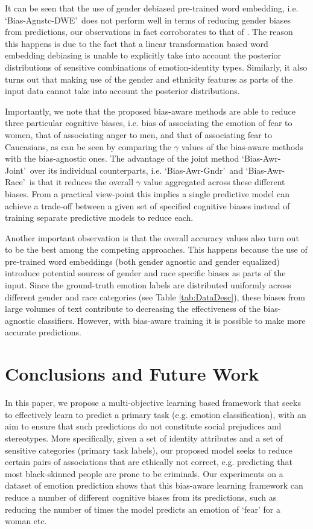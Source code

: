 \documentclass[letterpaper]{article}
\newcommand{\STWRDW}{`Bias-Agnstc-DWE'~}
\newcommand{\MTLG}{`Bias-Awr-Gndr'~}
\newcommand{\MTLR}{`Bias-Awr-Race'~}
\newcommand{\MTLB}{`Bias-Awr-Joint'~}
\begin{document}
It can be seen that the use of gender debiased pre-trained word embedding, i.e. \STWRDW does not perform well in terms of reducing gender biases from predictions, our observations in fact corroborates to that of \citep{gonen-goldberg-2019}. The reason this happens is due to the fact that a linear transformation based word embedding debiasing is unable to explicitly take into account the posterior distributions of sensitive combinations of emotion-identity types. Similarly, it also turns out that making use of the gender and ethnicity features as parts of the input data cannot take into account the posterior distributions.

Importantly, we note that the proposed bias-aware methods are
able to reduce three particular cognitive biases, i.e. bias of associating the emotion of fear to women, that of associating anger to men, and that of associating fear to Caucasians, as can be seen by comparing the $\gamma$ values of the bias-aware methods with the bias-agnostic ones. The advantage of the joint method \MTLB over its individual counterparts, i.e. \MTLG and \MTLR is that it reduces the overall $\gamma$ value aggregated across these different biases. From a practical view-point this implies a single predictive model can achieve a trade-off between a given set of specified cognitive biases instead of training separate predictive models to reduce each.

Another important observation is that the overall accuracy values also turn out to be the best among the competing approaches. This happens because the use of pre-trained word embeddings (both gender agnostic and gender equalized) introduce potential sources of gender and race specific biases as parts of the input. Since the ground-truth emotion labels are distributed uniformly across different gender and race categories (see Table \ref{tab:DataDesc}), these biases from large volumes of text contribute to decreasing the effectiveness of the bias-agnostic classifiers. However, with bias-aware training it is possible to make more accurate predictions.

\section{Conclusions and Future Work}

In this paper, we propose a multi-objective learning based framework that seeks to effectively learn to predict a primary task (e.g. emotion classification), with an aim to ensure that such predictions do not constitute social prejudices and stereotypes. More specifically, given a set of identity attributes and a set of sensitive categories (primary task labels), our proposed model seeks to reduce certain pairs of associations that are ethically not correct, e.g. predicting that most black-skinned people are prone to be criminals.
Our experiments on a dataset of emotion prediction shows that this bias-aware learning framework can reduce a number of different cognitive biases from its predictions, such as reducing the number of times the model predicts an emotion of `fear' for a woman etc.
\end{document}
